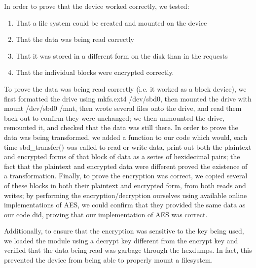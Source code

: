 \documentclass[letterpaper,10pt,titlepage,draftclsnofoot,onecolumn]{article}
\begin{document}
In order to prove that the device worked correctly, we tested:
\begin{enumerate}
\item That a file system could be created and mounted on the device
\item That the data was being read correctly
\item That it was stored in a different form on the disk than in the requests
\item That the individual blocks were encrypted correctly. 
\end{enumerate}
\par To prove the data was being read correctly (i.e. it worked as a block device), we first formatted the drive using mkfs.ext4 /dev/sbd0, then mounted the drive with mount /dev/sbd0 /mnt, then wrote several files onto the drive, and read them back out to confirm they were unchanged; we then unmounted the drive, remounted it, and checked that the data was still there. In order to prove the data was being transformed, we added a function to our code which would, each time sbd\_transfer() was called to read or write data, print out both the plaintext and encrypted forms of that block of data as a series of hexidecimal pairs; the fact that the plaintext and encrypted data were different proved the existence of a transformation. Finally, to prove the encryption was correct, we copied several of these blocks in both their plaintext and encrypted form, from both reads and writes; by performing the encryption/decryption ourselves using available online implementations of AES, we could confirm that they provided the same data as our code did, proving that our implementation of AES was correct.

Additionally, to ensure that the encryption was sensitive to the key being used, we loaded the module using a decrypt key different from the encrypt key and verified that the data being read was garbage through the hexdumps. In fact, this prevented the device from being able to properly mount a filesystem.
\end{document}
